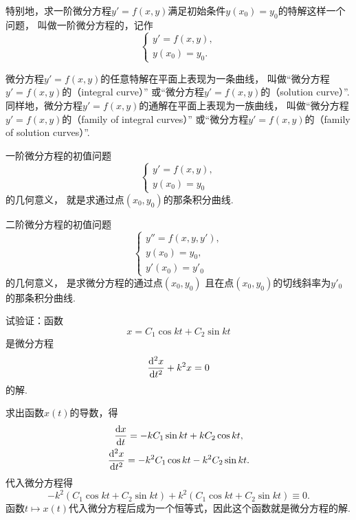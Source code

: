 特别地，求一阶微分方程\(y'=f(x,y)\)满足初始条件\(y(x_0) = y_0\)的特解这样一个问题，
叫做一阶微分方程的，记作\begin{equation*}
	\left\{ \begin{array}{l}
		y' = f(x,y), \\
		y(x_0) = y_0.
	\end{array} \right.
\end{equation*}

微分方程\(y'=f(x,y)\)的任意特解在平面上表现为一条曲线，
叫做“微分方程\(y'=f(x,y)\)的（integral curve）”
或“微分方程\(y'=f(x,y)\)的（solution curve）”.
同样地，微分方程\(y'=f(x,y)\)的通解在平面上表现为一族曲线，
叫做“微分方程\(y'=f(x,y)\)的（family of integral curves）”
或“微分方程\(y'=f(x,y)\)的（family of solution curves）”.

一阶微分方程的初值问题\begin{equation*}
	\left\{ \begin{array}{l}
		y' = f(x,y), \\
		y(x_0) = y_0
	\end{array} \right.
\end{equation*}的几何意义，
就是求通过点\((x_0,y_0)\)的那条积分曲线.

二阶微分方程的初值问题\begin{equation*}
	\left\{ \begin{array}{l}
		y'' = f(x,y,y'), \\
		y(x_0) = y_0, \\
		y'(x_0) = y'_0
	\end{array} \right.
\end{equation*}的几何意义，
是求微分方程的通过点\((x_0,y_0)\)
且在点\((x_0,y_0)\)的切线斜率为\(y'_0\)的那条积分曲线.

\begin{example}
试验证：函数\begin{equation*}
	x = C_1 \cos kt + C_2 \sin kt
\end{equation*}是微分方程\begin{equation*}
	\dv[2]{x}{t} + k^2 x = 0
\end{equation*}的解.
\begin{solution}
求出函数\(x(t)\)的导数，得\begin{gather*}
	\dv{x}{t} = -k C_1 \sin kt + k C_2 \cos kt, \\
	\dv[2]{x}{t} = -k^2 C_1 \cos kt - k^2 C_2 \sin kt.
\end{gather*}
代入微分方程得\begin{equation*}
	-k^2 (C_1 \cos kt + C_2 \sin kt) + k^2 (C_1 \cos kt + C_2 \sin kt)
	\equiv 0.
\end{equation*}
函数\(t \mapsto x(t)\)代入微分方程后成为一个恒等式，因此这个函数就是微分方程的解.
\end{solution}
\end{example}
